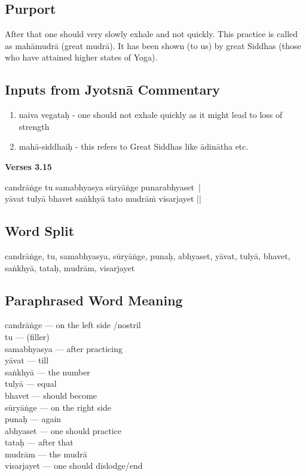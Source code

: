 \subsection*{Purport}

After that one should very slowly exhale and not quickly. This practice is called as mahāmudrā (great mudrā). It has been shown (to us) by great Siddhas (those who have attained higher states of Yoga).

\subsection*{Inputs from Jyotsnā Commentary}

\begin{enumerate}
\item naiva vegataḥ - one should not exhale quickly as it might lead to loss of strength 
\item mahā-siddhaiḥ - this refers to Great Siddhas like ādinātha etc.
\end{enumerate}


\noindent \textbf{Verses 3.15}

\begin{shloka}
candrāṅge tu samabhyasya sūryāṅge punarabhyaset |\\
yāvat tulyā bhavet saṅkhyā tato mudrāṁ visarjayet ||
\end{shloka}

\subsection*{Word Split}

candrāṅge, tu, samabhyasya, sūryāṅge, punaḥ, abhyaset, yāvat, tulyā, bhavet, saṅkhyā, tataḥ, mudrām, visarjayet 

\subsection*{Paraphrased Word Meaning}

\begin{multicols}{2}
candrāṅge --- on the left side /nostril \\
tu ---  (filler)\\
samabhyasya --- after practicing \\
yāvat --- till \\
saṅkhyā --- the number \\
tulyā --- equal \\
bhavet --- should become \\
sūryāṅge --- on the right side \\
punaḥ --- again \\
abhyaset --- one should practice \\
tataḥ --- after that \\
mudrām ---  the mudrā\\
visarjayet ---  one should dislodge/end 
\end{multicols}

